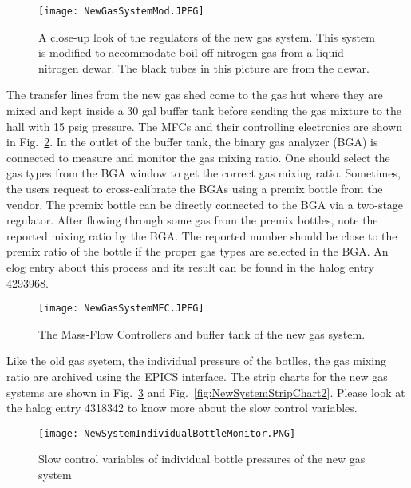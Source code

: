 \begin{figure}[h!]
\begin{center}
\texttt{[image: NewGasSystemMod.JPEG]}
\caption{A close-up look of the regulators of the new gas system. This system is modified to accommodate boil-off nitrogen gas from a liquid nitrogen dewar. The black tubes in this picture are from the dewar.}
\label{fig:NewSystemMod}
\end{center}
\end{figure}

The transfer lines from the new gas shed come to the gas hut where they are mixed and kept inside a 30 gal buffer
tank before sending the gas mixture to the hall with 15 psig pressure. The MFCs and their controlling electronics are
 shown in Fig.~\ref{fig:NewSystemMFC}. In the outlet of the buffer tank, the binary gas analyzer (BGA)
 is connected to measure and monitor the gas mixing ratio. One should select the gas types 
from the BGA window to get the correct gas mixing ratio. Sometimes, the users request to cross-calibrate the BGAs
using a premix bottle from the vendor. The premix bottle can be directly connected to the BGA via a two-stage regulator.
 After flowing through some gas from the premix bottles, note the reported mixing ratio by the BGA. The reported number should be close to the premix ratio of the bottle if the proper gas types are selected in the BGA. An elog entry about this process and its result can be found in the halog entry 4293968.   

\begin{figure}[h!]
\begin{center}
\texttt{[image: NewGasSystemMFC.JPEG]}
\caption{The Mass-Flow Controllers and buffer tank of the new gas system.}
\label{fig:NewSystemMFC}
\end{center}
\end{figure}

Like the old gas syetem, the individual pressure of the botlles, the gas mixing ratio are archived using
 the EPICS interface. The strip charts for the new gas systems are shown in 
Fig.~\ref{fig:NewSystemStripChart1} and Fig.~\ref{fig:NewSystemStripChart2}. Please look at the halog entry 4318342 to know more about the slow control variables.

\begin{figure}[h!]
\begin{center}
\texttt{[image: NewSystemIndividualBottleMonitor.PNG]}
\caption{Slow control variables of individual bottle pressures of the new gas system}
\label{fig:NewSystemStripChart1}
\end{center}
\end{figure}

